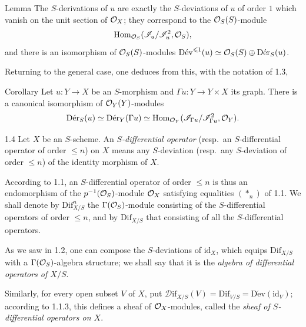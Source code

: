 \begin{enonce}{Lemma}{}
The $S$-derivations of $u$ are exactly the $S$-deviations of $u$ of order $1$ which vanish on the unit section of $\mathcal{O}_X$; they correspond to the $\mathcal{O}_S(S)$-module
\[
\operatorname{Hom}_{\mathcal{O}_S}(\mathscr I_u/\mathscr I_u^2,\mathcal{O}_S),
\]
and there is an isomorphism of $\mathcal{O}_S(S)$-modules $\operatorname{D\acute ev}^{\leqslant1}(u)\simeq\mathcal{O}_S(S)\oplus\operatorname{D\acute er}_S(u)$.
\end{enonce}
Returning to the general case, one deduces from this, with the notation of 1.3,
\begin{enonce}{Corollary}{}
Let $u:Y\to X$ be an $S$-morphism and $\Gamma u:Y\to Y\times X$ its graph. There is a canonical isomorphism of $\mathcal{O}_Y(Y)$-modules
\[
\operatorname{D\acute er}_S(u)\simeq\operatorname{D\acute er}_Y(\Gamma u)\simeq\operatorname{Hom}_{\mathcal{O}_Y}(\mathscr I_{\Gamma u}/\mathscr I_{\Gamma u}^2,\mathcal{O}_Y).
\]
\end{enonce}

\begin{definition}{1.4}\label{VIIA.1.4}
Let $X$ be an $S$-scheme. An \emph{$S$-differential operator} (resp.\ an $S$-differential operator of order $\leq n$) on $X$ means any $S$-deviation (resp.\ any $S$-deviation of order $\leq n$) of the identity morphism of $X$.

According to 1.1, an $S$-differential operator of order $\leq n$ is thus an endomorphism of the $p^{-1}(\mathcal{O}_S)$-module $\mathcal{O}_X$ satisfying equalities $(*_n)$ of 1.1. We shall denote by $\mathrm{Dif}_{X/S}^n$ the $\Gamma(\mathcal{O}_S)$-module consisting of the $S$-differential operators of order $\leq n$, and by $\mathrm{Dif}_{X/S}$ that consisting of all the $S$-differential operators.

As we saw in 1.2, one can compose the $S$-deviations of $\mathrm{id}_X$, which equips $\mathrm{Dif}_{X/S}$ with a $\Gamma(\mathcal{O}_S)$-algebra structure; we shall say that it is the \emph{algebra of differential operators of $X/S$}.

Similarly, for every open subset $V$ of $X$, put $\mathscr D\!\mathrm{if}_{X/S}(V)=\mathrm{Dif}_{V/S}=\operatorname{D\acute ev}(\mathrm{id}_V)$; according to 1.1.3, this defines a sheaf of $\mathcal{O}_X$-modules, called the \emph{sheaf of $S$-differential operators on $X$}.
\end{definition}

